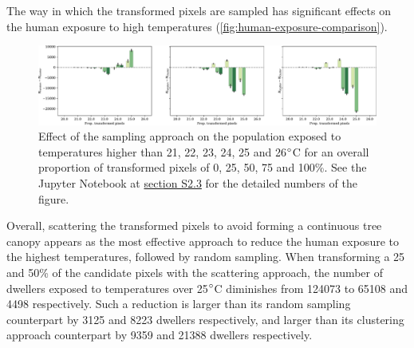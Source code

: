 \documentclass[10pt,letterpaper]{article}
\begin{document}
The way in which the transformed pixels are sampled has significant effects on the human exposure to high temperatures (\autoref{fig:human-exposure-comparison}). 
\begin{figure}[ht]
  \begin{adjustwidth}{-.4\textwidth}{0cm}  
    \centering
    \includegraphics[width=\linewidth]{figures/human-exposure-comparison}
    \caption{\label{fig:human-exposure-comparison} Effect of the sampling approach on the population exposed to temperatures higher than 21, 22, 23, 24, 25 and 26$\degree$C for an overall proportion of transformed pixels of 0, 25, 50, 75 and 100\%. See the Jupyter Notebook at \hyperref[sec:si-human-exposure]{section S2.3} for the detailed numbers of the figure.}
  \end{adjustwidth}
\end{figure}
Overall, scattering the transformed pixels to avoid forming a continuous tree canopy appears as the most effective approach to reduce the human exposure to the highest temperatures, followed by random sampling.
When transforming a 25 and 50\% of the candidate pixels with the scattering approach, the number of dwellers exposed to temperatures over 25$\degree$C diminishes from 124073 to 65108 and 4498 respectively. %
Such a reduction is larger than its random sampling counterpart by 3125 and 8223 dwellers respectively, and larger than its clustering approach counterpart by 9359 and 21388 dwellers respectively.
\end{document}
